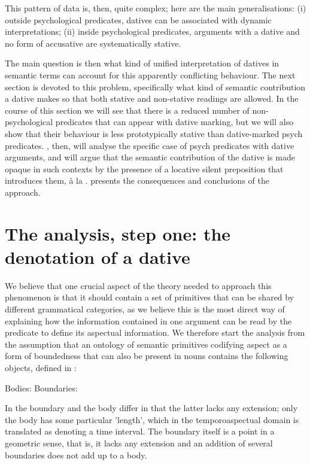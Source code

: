 \documentclass[output=paper,colorlinks,citecolor=brown,nonflat]{langsci/langscibook}
\begin{document}
This pattern of data is, then, quite complex; here are the main generalisations: (i) outside psychological predicates, datives can be associated with dynamic interpretations; (ii) inside psychological predicates, arguments with a dative and no form of accusative are systematically stative.

The main question is then what kind of unified interpretation of datives in semantic terms can account for this apparently conflicting behaviour. The next section is devoted to this problem, specifically what kind of semantic contribution a dative makes so that both stative and non-stative readings are allowed. In the course of this section we will see that there is a reduced number of non-psychological predicates that can appear with dative marking, but we will also show that their behaviour is less prototypically stative than dative-marked psych predicates. , then, will analyse the specific case of psych predicates with dative arguments, and will argue that the semantic contribution of the dative is made opaque in such contexts by the presence of a locative silent preposition that introduces them, à la \citet{Landau2010}.  presents the consequences and conclusions of the approach.

\section{The analysis, step one: the denotation of a dative}\label{sec:fabregas:2}

We believe that one crucial aspect of the theory needed to approach this phenomenon is that it should contain a set of primitives that can be shared by different grammatical categories, as we believe this is the most direct way of explaining how the information contained in one argument can be read by the predicate to define its aspectual information. We therefore start the analysis from the assumption that an ontology of semantic primitives codifying aspect as a form of boundedness that can also be present in nouns contains the following objects, defined in \citet{Piñón1997}:

\ea%
    \label{ex:fabregas:13}
    \ea\label{ex:fabregas:13a}
    Bodies: {\midline}
    \ex\label{ex:fabregas:13b}
    Boundaries: {\textbar}
    \z
\z

In \citet{Piñón1997} the boundary and the body differ in that the latter lacks any extension; only the body has some particular 'length', which in the temporoaspectual domain is translated as denoting a time interval. The boundary itself is a point in a geometric sense, that is, it lacks any extension and an addition of several boundaries does not add up to a body.
\end{document}
